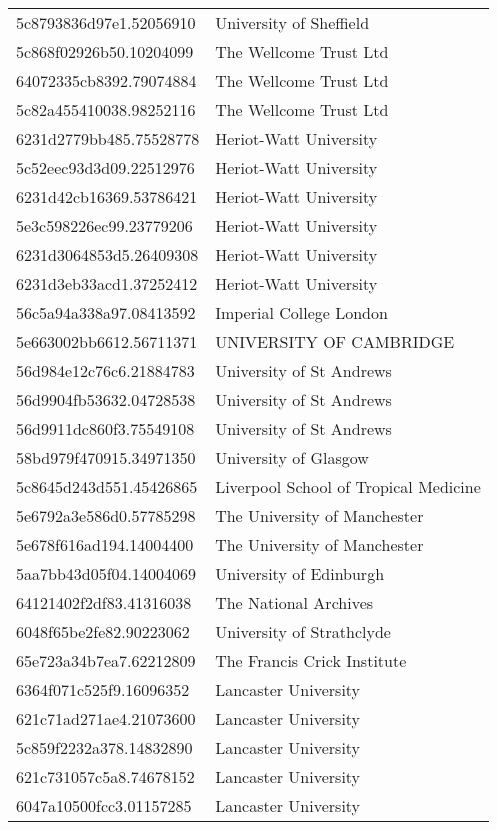 \begin{tabular}{ll}
5c8793836d97e1.52056910 & University of Sheffield \\
5c868f02926b50.10204099 & The Wellcome Trust Ltd \\
64072335cb8392.79074884 & The Wellcome Trust Ltd \\
5c82a455410038.98252116 & The Wellcome Trust Ltd \\
6231d2779bb485.75528778 & Heriot-Watt University \\
5c52eec93d3d09.22512976 & Heriot-Watt University \\
6231d42cb16369.53786421 & Heriot-Watt University \\
5e3c598226ec99.23779206 & Heriot-Watt University \\
6231d3064853d5.26409308 & Heriot-Watt University \\
6231d3eb33acd1.37252412 & Heriot-Watt University \\
56c5a94a338a97.08413592 & Imperial College London \\
5e663002bb6612.56711371 & UNIVERSITY OF CAMBRIDGE \\
56d984e12c76c6.21884783 & University of St Andrews \\
56d9904fb53632.04728538 & University of St Andrews \\
56d9911dc860f3.75549108 & University of St Andrews \\
58bd979f470915.34971350 & University of Glasgow \\
5c8645d243d551.45426865 & Liverpool School of Tropical Medicine \\
5e6792a3e586d0.57785298 & The University of Manchester \\
5e678f616ad194.14004400 & The University of Manchester \\
5aa7bb43d05f04.14004069 & University of Edinburgh \\
64121402f2df83.41316038 & The National Archives \\
6048f65be2fe82.90223062 & University of Strathclyde \\
65e723a34b7ea7.62212809 & The Francis Crick Institute \\
6364f071c525f9.16096352 & Lancaster University \\
621c71ad271ae4.21073600 & Lancaster University \\
5c859f2232a378.14832890 & Lancaster University \\
621c731057c5a8.74678152 & Lancaster University \\
6047a10500fcc3.01157285 & Lancaster University \\

\end{tabular}
